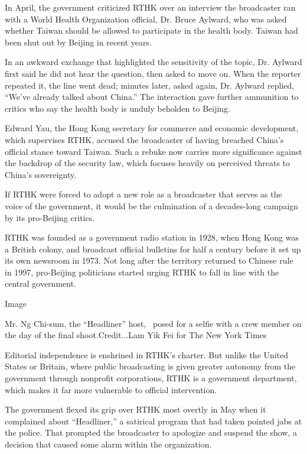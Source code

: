 In April, the government criticized RTHK over an interview the
broadcaster ran with a World Health Organization official, Dr. Bruce
Aylward, who was asked whether Taiwan should be allowed to participate
in the health body. Taiwan had been shut out by Beijing in recent years.

In an awkward exchange that highlighted the sensitivity of the topic,
Dr. Aylward first said he did not hear the question, then asked to move
on. When the reporter repeated it, the line went dead; minutes later,
asked again, Dr. Aylward replied, ``We've already talked about China.''
The interaction gave further ammunition to critics who say the health
body is unduly beholden to Beijing.

Edward Yau, the Hong Kong secretary for commerce and economic
development, which supervises RTHK, accused the broadcaster of having
breached China's official stance toward Taiwan. Such a rebuke now
carries more significance against the backdrop of the security law,
which focuses heavily on perceived threats to China's sovereignty.

If RTHK were forced to adopt a new role as a broadcaster that serves as
the voice of the government, it would be the culmination of a
decades-long campaign by its pro-Beijing critics.

RTHK was founded as a government radio station in 1928, when Hong Kong
was a British colony, and broadcast official bulletins for half a
century before it set up its own newsroom in 1973. Not long after the
territory returned to Chinese rule in 1997, pro-Beijing politicians
started urging RTHK to fall in line with the central government.

Image

Mr. Ng Chi-sum, the ``Headliner'' host,~ posed for a selfie with a crew
member on the day of the final shoot.Credit...Lam Yik Fei for The New
York Times

Editorial independence is enshrined in RTHK's charter. But unlike the
United States or Britain, where public broadcasting is given greater
autonomy from the government through nonprofit corporations, RTHK is a
government department, which makes it far more vulnerable to official
intervention.

The government flexed its grip over RTHK most overtly in May when it
complained about ``Headliner,'' a satirical program that had taken
pointed jabs at the police. That prompted the broadcaster to apologize
and suspend the show, a decision that caused some alarm within the
organization.

